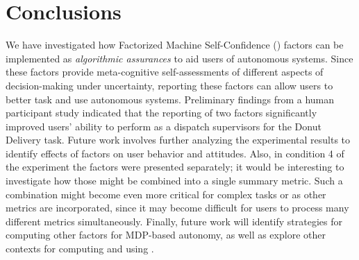 \section{Conclusions} \label{sec:conclusions}
%
We have investigated how Factorized Machine Self-Confidence (\famsec{}) factors can be implemented as \emph{algorithmic assurances} to aid users of autonomous systems. Since these factors provide meta-cognitive self-assessments of different aspects of decision-making under uncertainty, reporting these factors can allow users to better task and use autonomous systems. Preliminary findings from a human participant study indicated that the reporting of two \famsec{} factors %
significantly improved users' ability to perform as a dispatch supervisors for the Donut Delivery task. %
Future work involves further analyzing the experimental results to identify effects of \famsec{} factors on user behavior and attitudes. Also, in condition 4 of the experiment the factors were presented separately; it would be interesting to investigate how those might be combined into a single summary metric. Such a combination might become even more critical for complex tasks or as other \famsec{} metrics are incorporated, since it may become difficult for users to process many different metrics simultaneously. Finally, future work will identify strategies for computing other \famsec{} factors for MDP-based autonomy, as well as explore other contexts for computing and using \famsec{}. %
